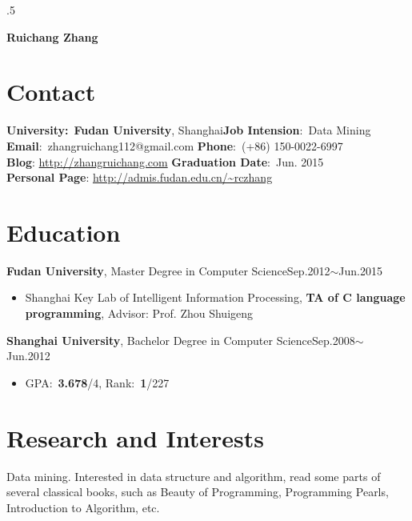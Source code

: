 \documentclass[margin]{res}
\begin{document}
 \moveleft.5\hoffset\centerline{\large\bf Ruichang Zhang}
 \iffalse
 \moveleft\hoffset\vbox{\hrule width\resumewidth height 1pt}\smallskip
 \moveleft.5\hoffset\centerline{Address: Room 502, Yifu Building, \textbf{Fudan University}, 220 Handan Road, Shanghai 200433, China.}
 \moveleft.5\hoffset\centerline{Phone: (+86) 150-0022-6997, Email: rczhang@fudan.edu.cn}
\moveleft.5\hoffset\centerline{Homepage: }%
\fi
\begin{resume}
\setlength{\parskip}{0.1em}
\section{Contact}
\textbf{University:}~{\bf Fudan University}, Shanghai\hfill \textbf{Job Intension}:~Data Mining\\
\textbf{Email}:~zhangruichang112@gmail.com \hfill  \textbf{Phone}:~(+86) 150-0022-6997\\
\textbf{Blog}: \url{http://zhangruichang.com} \hfill \textbf{Graduation Date}:~Jun. 2015\\
\textbf{Personal Page}: \url{http://admis.fudan.edu.cn/~rczhang}
\section{Education}
 {\bf Fudan University}, Master Degree in Computer Science\hfill Sep.2012$\sim$Jun.2015
 \begin{itemize} \itemsep -1pt  %
 \item Shanghai Key Lab of Intelligent Information Processing, \textbf{TA of C language programming}, Advisor: Prof. Zhou Shuigeng
 \end{itemize}
 {\bf Shanghai University}, Bachelor Degree in Computer Science\hfill Sep.2008$\sim$ Jun.2012
\begin{itemize} \itemsep -1pt %
\item GPA:~\textbf{3.678}/4, Rank:~\textbf{1}/227
\end{itemize}
\section{Research and Interests}
Data mining. Interested in data structure and algorithm, read some parts of several classical books, such as Beauty of Programming, Programming Pearls, Introduction to Algorithm, etc.

\end{resume}
\end{document}
